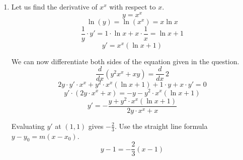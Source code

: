 \documentclass[a4paper, 12pt]{article}
\begin{document}
\begin{enumerate}[leftmargin=*,label=\textbf{\arabic*.}]
\begin{enumerate}[leftmargin=*,label=\textbf{\alph*.}]
\vspace{-1.2em}
$\boxed{\parbox{0.98\linewidth}{The MVT states that if a function $f$ is continuous on $[a,b]$ and differentiable on $(a,b)$, there is at least one point $P$ on the interval $(a,b)$ such that the slope of the line that passes through the endpoints is equal to the slope of the line that is tangent to $P$}}$

\item Let $f(x)= e^x$. $f$ is continuous on $[0,x]$ and differentiable on $(0,x)$.  There exists at least one point $c$ on $(0,x)$ such that
\[f'(c) =  e^c=\frac{ e^x-1}x=\frac{f(x)-f(0)}{x-0}\]

From the inequality $0<c<x$,
\[ e^0< e^c< e^x\]
\[1<\frac{ e^x-1}x< e^x\]
\[x< e^x-1 <x e^x\]
\[1+x< e^x <1+x e^x\]
\end{enumerate}

\item Let us find the derivative of $x^x$ with respect to $x$.
\[y=x^x\]
\[\ln(y)=\ln(x^x) = x\ln x\]
\[\frac1y\cdot y'=1\cdot\ln x + x\cdot \frac1x = \ln x +1\]
\[y'=x^x(\ln x+1)\]

We can now differentiate both sides of the equation given in the question.
\[\frac d{dx}\left(y^2x^x + xy\right) = \frac d{dx}\,2\]
\[2y\cdot y'\cdot x^x + y^2\cdot x^x(\ln x+1)+1\cdot y +x\cdot y'=0\]
\[y'\cdot\left(2y\cdot x^x + x\right)=-y-y^2\cdot x^x(\ln x+1)\]
\[y'=-\frac{y+y^2\cdot x^x(\ln x+1)}{2y\cdot x^x+x}\]

Evaluating $y'$ at $(1,1)$ gives $\displaystyle-\frac23$. Use the straight line formula $y-y_0 = m(x-x_0)$.
\[\boxed{y-1 =-\frac23(x-1)}\]


\end{enumerate}
\end{document}
